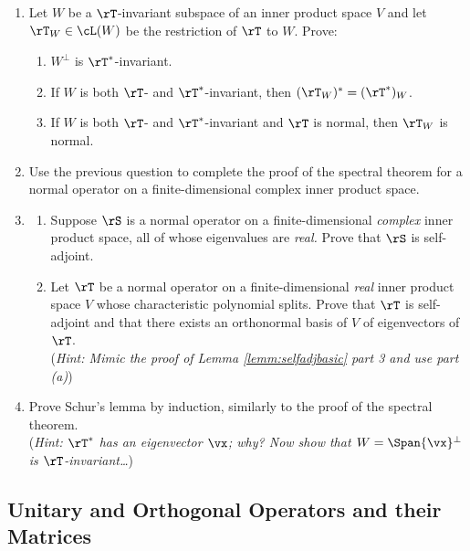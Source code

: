 \begin{exercises}
\begin{enumerate}
    
  \item\label{ex:normalspec1} Let $W$ be a $\rT$-invariant subspace of an inner product space $V$ and let $\at\rT W\in\cL(W)$ be the restriction of $\rT$ to $W$. Prove:
  \begin{enumerate}
    \item $W^\perp$ is $\rT^*$-invariant.
    \item If $W$ is both $\rT$- and $\rT^*$-invariant, then $(\at\rT W)^*=\at{(\rT^*)}W$.
    \item If $W$ is both $\rT$- and $\rT^*$-invariant and $\rT$ is normal, then $\at\rT W$ is normal.
  \end{enumerate}
  
  \item\label{ex:normalspec2} Use the previous question to complete the proof of the spectral theorem for a normal operator on a finite-dimensional complex inner product space.
  
  \item\begin{enumerate}
    \item Suppose $\rS$ is a normal operator on a finite-dimensional \emph{complex} inner product space, all of whose eigenvalues are \emph{real.} Prove that $\rS$ is self-adjoint.
    \item Let $\rT$ be a normal operator on a finite-dimensional \emph{real} inner product space $V$ whose characteristic polynomial splits. Prove that $\rT$ is self-adjoint and that there exists an orthonormal basis of $V$ of eigenvectors of $\rT$.\\[2pt]
    (\emph{Hint: Mimic the proof of Lemma \ref{lemm:selfadjbasic} part 3 and use part (a)})
  \end{enumerate}
  
  \item Prove Schur's lemma by induction, similarly to the proof of the spectral theorem.\\[2pt]
  (\emph{Hint: $\rT^*$ has an eigenvector $\vx$; why? Now show that $W=\Span\{\vx\}^\perp$ is $\rT$-invariant\ldots})
\end{enumerate}
\end{exercises}

\clearpage

\subsection{Unitary and Orthogonal Operators and their Matrices}

